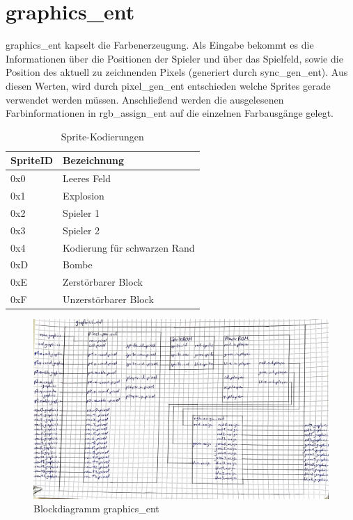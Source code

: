 \documentclass[parskip=full]{scrartcl}
\begin{document}
		\section{graphics\_ent}
			graphics\_ent kapselt die Farbenerzeugung. Als Eingabe bekommt es die Informationen über die Positionen der Spieler und über das Spielfeld, sowie die Position des aktuell zu zeichnenden Pixels (generiert durch sync\_gen\_ent). Aus diesen Werten, wird durch pixel\_gen\_ent entschieden welche Sprites gerade verwendet werden müssen. Anschließend werden die ausgelesenen Farbinformationen in rgb\_assign\_ent auf die einzelnen Farbausgänge gelegt.\newline
			
			\begin{table}[H]
				\centering
				\label{spriteCode}
				\begin{tabular}{|l|l|}
					\hline
					\textbf{SpriteID} & \textbf{Bezeichnung}      \\ \hline
					0x0           & Leeres Feld               \\ \hline
					0x1           & Explosion                 \\ \hline
					0x2           & Spieler 1                 \\ \hline
					0x3           & Spieler 2                 \\ \hline
					0x4           & Kodierung für schwarzen Rand \\ \hline
					0xD           & Bombe                     \\ \hline
					0xE           & Zerstörbarer Block        \\ \hline
					0xF           & Unzerstörbarer Block      \\ \hline
				\end{tabular}
				\caption{Sprite-Kodierungen}
			\end{table}
		
			\begin{figure}[H]
				\centering
				\includegraphics[angle=90,scale=0.1]{./bilder/graphics_ent.jpg}
				\caption{Blockdiagramm graphics\_ent}
			\end{figure}
			
\end{document}
